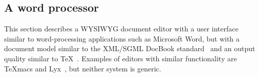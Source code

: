 \documentclass{speauth}
\begin{document}
%																
\subsection{A word processor} \label{sect:wordprocessor} 

This section describes a WYSIWYG document editor with a user interface similar to word-processing applications such as Microsoft Word, but with a document model similar to the XML/SGML DocBook standard~\cite{walsh02docbook} and an output quality similar to \TeX~\cite{knuth84tex}. Examples of editors with similar functionality are TeXmacs\cite{texmacs} and Lyx~\cite{lyx}, but neither system is generic.
\vspace*{1.4ex}


\newcommand{\screenshotWin}[2]{%
%
\noindent 
\begin{center}
\begin{picture}(225,165)(0,0)
\begin{scriptsize}
\put(-2,30){ \epsfig{file=pics/eps/WordprocessorWindow.eps, height=4.8cm}}
\put(0,132){ 
\begin{tabular}[t]{p{7cm}}
\hfill{\normalsize Proxima}\hfill~\\
\vspace{0.001cm}
\hfill{\scriptsize Martijn M. Schrage}\hfill~\\
\vspace{0.0005cm}
{\small Contents}\\
\vspace{0.0007cm}
~~~1~~Editing~structured~documents\\
~~~2~~Use cases \\
~~~3~~Functional requirements\\
\vspace{0.2cm}
{\small 1~~Editing~structured~documents}\\
\vspace{0.001cm}
\parbox{6.9cm}{While the term {\em editor} is usually only associated with plain-text editors such as Emacs~\cite{stallman81emacs} or\vline~ the ubiquitous Microsoft Notepad, we will ~~~~~~~~~~~~~~~~~\strut
}\\
\end{tabular}
}
\end{scriptsize}
\put(0,0) { \makebox(190,30){#2}}
\end{picture}
\end{center}
}
\end{document}
